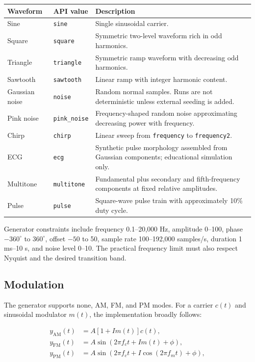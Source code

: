 \documentclass[10pt,a4paper]{article}
\newcommand{\code}[1]{\nolinkurl{#1}}
\begin{document}
\begin{longtable}{L{3.2cm}L{3cm}L{8.2cm}}
\toprule
Waveform & API value & Description\\
\midrule
\endhead
Sine & \code{sine} & Single sinusoidal carrier.\\
Square & \code{square} & Symmetric two-level waveform rich in odd harmonics.\\
Triangle & \code{triangle} & Symmetric ramp waveform with decreasing odd harmonics.\\
Sawtooth & \code{sawtooth} & Linear ramp with integer harmonic content.\\
Gaussian noise & \code{noise} & Random normal samples. Runs are not deterministic unless external seeding is added.\\
Pink noise & \code{pink\_noise} & Frequency-shaped random noise approximating decreasing power with frequency.\\
Chirp & \code{chirp} & Linear sweep from \code{frequency} to \code{frequency2}.\\
ECG & \code{ecg} & Synthetic pulse morphology assembled from Gaussian components; educational simulation only.\\
Multitone & \code{multitone} & Fundamental plus secondary and fifth-frequency components at fixed relative amplitudes.\\
Pulse & \code{pulse} & Square-wave pulse train with approximately 10\% duty cycle.\\
\bottomrule
\end{longtable}

Generator constraints include frequency 0.1--20,000 Hz, amplitude 0--100, phase $-360^\circ$ to $360^\circ$, offset $-50$ to 50, sample rate 100--192,000 samples/s, duration 1 ms--10 s, and noise level 0--10. The practical frequency limit must also respect Nyquist and the desired transition band.

\subsection{Modulation}

The generator supports none, AM, FM, and PM modes. For a carrier $c(t)$ and sinusoidal modulator $m(t)$, the implementation broadly follows:

\begin{align*}
 y_{\mathrm{AM}}(t) &= A[1+I m(t)]c(t),\\
 y_{\mathrm{FM}}(t) &= A\sin(2\pi f_c t + I m(t)+\phi),\\
 y_{\mathrm{PM}}(t) &= A\sin(2\pi f_c t + I\cos(2\pi f_m t)+\phi),
\end{align*}
\end{document}
